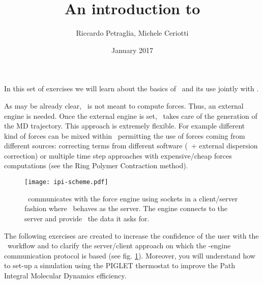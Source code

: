 \documentclass{article}
\title{An introduction to \ipi{}}
\author{Riccardo Petraglia, Michele Ceriotti}
\date{January 2017}
\begin{document}
\maketitle

In this set of exercises we will learn about the basics of \ipi\ and
its use jointly with \qe.

As may be already clear, \ipi\ is not meant to compute forces. Thus,
an external engine is needed. Once the external engine is set, \ipi\
takes care of the generation of the MD trajectory. This approach
is extremely flexible. For example different kind of forces can be
mixed within \ipi\ permitting the use of forces coming from different
sources: correcting terms from different software (\PWscf~+ external
dispersion correction) or multiple time step approaches with
expensive/cheap forces computations (see the Ring Polymer Contraction
method).

\begin{figure}[h!]
\centering
\texttt{[image: ipi-scheme.pdf]}
\caption{\ipi\ communicates with the force engine using sockets in a
  client/server fashion where \ipi\ behaves as the server. The engine
  connects to the server and provide \ipi\ the data it asks
  for.}\label{fig:ipi-scheme}
\end{figure}


The following exercises are created to increase the confidence of the user
with the \ipi\ workflow and to clarify the server/client approach on
which the \ipi-engine communication protocol is based (see
fig. \ref{fig:ipi-scheme}). Moreover, you will understand how to
set-up a simulation using the PIGLET thermostat to improve the Path
Integral Molecular Dynamics efficiency.
\end{document}
